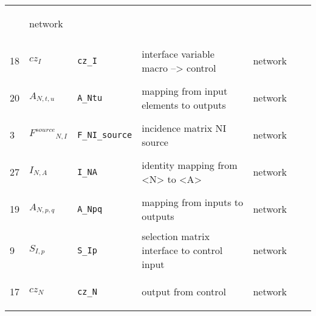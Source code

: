 \begin{longtable}{|p{1cm}|p{2.5cm}|p{4.5cm}|p{8cm}|p{3.0cm}|p{3cm}|p{1cm}|}
             & \begin{lay}network \end{lay}
             & $  $
             & \\
            18
             & \hypertarget{"v:18"}{ $ {{cz}}{_{I}} $}
             & \verb|cz_I|
             & interface variable macro --> control
             & \begin{lay}network \end{lay}
             & $  $
             & \\
            20
             & \hypertarget{"v:20"}{ $ {{A}}{_{N, t, u}} $}
             & \verb|A_Ntu|
             & mapping from input elements to outputs
             & \begin{lay}network \end{lay}
             & $  $
             & \\
            3
             & \hypertarget{"v:3"}{ $ {{F^{source}}}{_{N, I}} $}
             & \verb|F_NI_source|
             & incidence matrix NI source
             & \begin{lay}network \end{lay}
             & $  $
             & \\
            27
             & \hypertarget{"v:27"}{ $ {{I}}{_{N, A}} $}
             & \verb|I_NA|
             & identity mapping from <N> to <A>
             & \begin{lay}network \end{lay}
             & $  $
             & \\
            19
             & \hypertarget{"v:19"}{ $ {{A}}{_{N, p, q}} $}
             & \verb|A_Npq|
             & mapping from inputs to outputs
             & \begin{lay}network \end{lay}
             & $  $
             & \\
            9
             & \hypertarget{"v:9"}{ $ {{S}}{_{I, p}} $}
             & \verb|S_Ip|
             & selection matrix interface to control input
             & \begin{lay}network \end{lay}
             & $  $
             & \\
            17
             & \hypertarget{"v:17"}{ $ {{cz}}{_{N}} $}
             & \verb|cz_N|
             & output from control
             & \begin{lay}network \end{lay}
             & $  $

\end{longtable}
